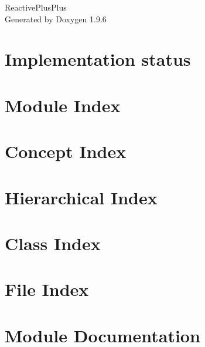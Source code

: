 \documentclass[twoside]{book}
\newcommand{\+}{\discretionary{\mbox{\scriptsize$\hookleftarrow$}}{}{}}
\newcommand{\clearemptydoublepage}{%
    \newpage{\pagestyle{empty}\cleardoublepage}%
  }
\begin{document}
  \raggedbottom
    \hypersetup{pageanchor=false,
                bookmarksnumbered=true,
                pdfencoding=unicode
               }
  \begin{titlepage}
  \vspace*{7cm}
  \begin{center}%
  {\Large Reactive\+Plus\+Plus}\\
  \vspace*{1cm}
  {\large Generated by Doxygen 1.9.6}\\
  \end{center}
  \end{titlepage}
  \clearemptydoublepage
  \tableofcontents
  \clearemptydoublepage
  \hypersetup{pageanchor=true}
\chapter{Implementation status}
\label{md_docs__implementation__status}

\chapter{Module Index}

\chapter{Concept Index}

\chapter{Hierarchical Index}

\chapter{Class Index}

\chapter{File Index}

\chapter{Module Documentation}










\end{document}
